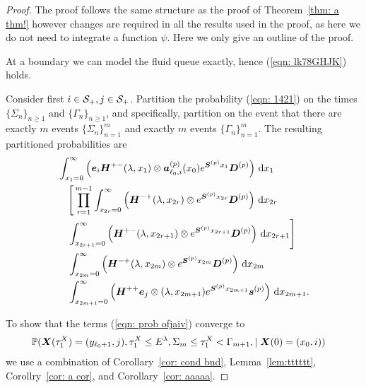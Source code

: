 \begin{proof}
	The proof follows the same structure as the proof of Theorem~\ref{thm: a thm!} however changes are required in all the results used in the proof, as here we do not need to integrate a function \(\psi\). Here we only give an outline of the proof. 

	At a boundary we can model the fluid queue exactly, hence (\ref{eqn: lk78GHJK}) holds.

	Consider first \(i\in \mathcal{S}_+,j\in\mathcal{S}_+\). Partition the probability (\ref{eqn: 1421}) on the times \(\{\Sigma_n\}_{n\geq 1}\) and \(\{\Gamma_n\}_{n\geq 1}\), and specifically, partition on the event that there are exactly \(m\) events \(\{\Sigma_n\}_{n=1}^m\) and exactly \(m\) events \(\{\Gamma_n\}_{n=1}^m\). %
	The resulting partitioned probabilities are
	\begin{align}
                 &\int_{x_1=0}^\infty \left(\boldsymbol e_i\boldsymbol H^{+-}(\lambda,x_1)\otimes \boldsymbol a_{\ell_0,i}^{(p)}(x_0)e^{\boldsymbol{S}^{(p)}x_1}\boldsymbol{D}^{(p)}\right)\, \mathrm{d} x_1 \nonumber
            	\\&\nonumber \quad \Bigg[\prod_{r=1}^{m-1} \int_{x_{2r}=0}^\infty \left(\boldsymbol H^{-+}(\lambda,x_{2r}) \otimes e^{\boldsymbol{S}^{(p)}x_{2r}}\boldsymbol D^{(p)}\right)\, \mathrm{d} x_{2r} \\&\quad \int_{x_{2r+1}=0}^\infty \left(\boldsymbol H^{+-}(\lambda,x_{2r+1}) \otimes e^{\boldsymbol{S}^{(p)}x_{2r+1}}\boldsymbol D^{(p)}\right) \, \mathrm{d} x_{2r+1}\Bigg] \nonumber
            	\\&
            	\quad \int_{x_{2m}=0}^\infty \left(\boldsymbol H^{-+}(\lambda, x_{2m}) \otimes e^{\boldsymbol{S}^{(p)}x_{2m}}\boldsymbol{D}^{(p)}\right) \, \mathrm{d} x_{2m} \nonumber
				\\&\quad \int_{x_{2m+1}=0}^\infty \left( \boldsymbol H^{++}\boldsymbol e_j \otimes (\lambda,x_{2m+1}) e^{\boldsymbol{S}^{(p)}x_{2m+1}}\boldsymbol s^{(p)} \right) \, \mathrm{d} x_{2m+1}.  \label{eqn: prob ofjaiv}
	\end{align}

	To show that the terms (\ref{eqn: prob ofjaiv}) converge to 
	\begin{align}
		&\mathbb P(\boldsymbol X(\tau_1^X)=(y_{\ell_0+1},j),\tau_1^X\leq E^\lambda, \Sigma_{m}\leq \tau_1^X<\Gamma_{m+1}, \mid \boldsymbol X(0)=(x_0, i))
	\end{align}
	we use a combination of Corollary~\ref{cor: cond bnd}, Lemma~\ref{lem:tttttt}, Corollry~\ref{cor: a cor}, and Corollary~\ref{cor: aaaaa}.


\end{proof}
